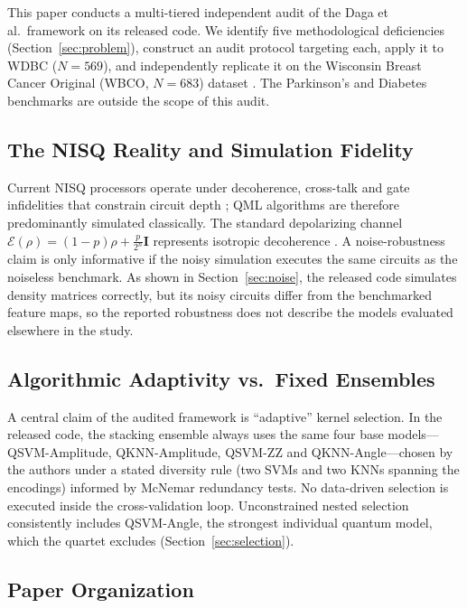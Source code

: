 \documentclass[journal,twocolumn]{IEEEtran}
\begin{document}
This paper conducts a multi-tiered independent audit of the Daga et al.\ framework on its released code. We identify five methodological deficiencies (Section~\ref{sec:problem}), construct an audit protocol targeting each, apply it to WDBC ($N=569$), and independently replicate it on the Wisconsin Breast Cancer Original (WBCO, $N=683$) dataset \cite{wolberg1990multisurface}. The Parkinson's and Diabetes benchmarks are outside the scope of this audit.

\subsection{The NISQ Reality and Simulation Fidelity}

Current NISQ processors operate under decoherence, cross-talk and gate infidelities that constrain circuit depth \cite{preskill2018quantum}; QML algorithms are therefore predominantly simulated classically. The standard depolarizing channel $\mathcal{E}(\rho) = (1-p)\rho + \frac{p}{2^n}\mathbf{I}$ represents isotropic decoherence \cite{nielsen2010quantum}. A noise-robustness claim is only informative if the noisy simulation executes the same circuits as the noiseless benchmark. As shown in Section~\ref{sec:noise}, the released code simulates density matrices correctly, but its noisy circuits differ from the benchmarked feature maps, so the reported robustness does not describe the models evaluated elsewhere in the study.

\subsection{Algorithmic Adaptivity vs.\ Fixed Ensembles}

A central claim of the audited framework is ``adaptive'' kernel selection. In the released code, the stacking ensemble always uses the same four base models---QSVM-Amplitude, QKNN-Amplitude, QSVM-ZZ and QKNN-Angle---chosen by the authors under a stated diversity rule (two SVMs and two KNNs spanning the encodings) informed by McNemar redundancy tests. No data-driven selection is executed inside the cross-validation loop. Unconstrained nested selection consistently includes QSVM-Angle, the strongest individual quantum model, which the quartet excludes (Section~\ref{sec:selection}).

\subsection{Paper Organization}
\end{document}
